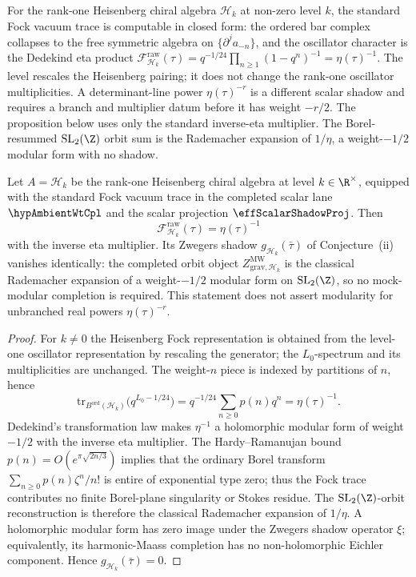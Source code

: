 For the rank-one Heisenberg chiral algebra $\mathcal H_{k}$ at
non-zero level \(k\), the standard Fock vacuum trace is computable in
closed form: the ordered bar complex collapses to the free symmetric
algebra on $\{\partial^{j} a_{-n}\}$, and the oscillator character is the
Dedekind eta product
$\mathcal F^{\mathrm{raw}}_{\mathcal H_{k}}(\tau)
= q^{-1/24}\prod_{n \ge 1}(1 - q^{n})^{-1}
= \eta(\tau)^{-1}$.
The level rescales the Heisenberg pairing; it does not change the
rank-one oscillator multiplicities. A determinant-line power
\(\eta(\tau)^{-r}\) is a different scalar shadow and requires a branch
and multiplier datum before it has weight \(-r/2\). The proposition
below uses only the standard inverse-eta multiplier. The
Borel-resummed $\mathrm{SL}_{2}(\Z)$ orbit sum is the Rademacher
expansion of \(1/\eta\), a weight-\(-1/2\) modular form with no shadow.

\begin{proposition}
\label{prop:3dg-zwegers-heisenberg-shadow}
%
Let \(A=\mathcal H_k\) be the rank-one Heisenberg chiral algebra at
level \(k\in\R^{\times}\), equipped with the standard Fock vacuum trace
in the completed scalar lane \(\hypAmbientWtCpl\) and the scalar
projection \(\effScalarShadowProj\). Then
\[
\mathcal F^{\mathrm{raw}}_{\mathcal H_k}(\tau)=\eta(\tau)^{-1}
\]
with the inverse eta multiplier. Its Zwegers shadow
\(g_{\mathcal H_k}(\bar\tau)\) of Conjecture~\textup{(ii)} vanishes
identically: the completed orbit object
\(Z^{\mathrm{MW}}_{\mathrm{grav},\mathcal H_k}\) is the classical
Rademacher expansion of a weight-\(-1/2\) modular form on
\(\mathrm{SL}_{2}(\Z)\), so no mock-modular completion is required.
This statement does not assert modularity for unbranched real powers
\(\eta(\tau)^{-r}\).
\end{proposition}

\begin{proof}
For \(k\ne0\) the Heisenberg Fock representation is obtained from the
level-one oscillator representation by rescaling the generator; the
\(L_0\)-spectrum and its multiplicities are unchanged. The weight-\(n\)
piece is indexed by partitions of \(n\), hence
\[
\mathrm{tr}_{B^{\mathrm{ord}}(\mathcal H_k)}
\bigl(q^{L_0-1/24}\bigr)
=q^{-1/24}\sum_{n\ge0}p(n)q^n
=\eta(\tau)^{-1}.
\]
Dedekind's transformation law makes \(\eta^{-1}\) a holomorphic
modular form of weight \(-1/2\) with the inverse eta multiplier. The
Hardy--Ramanujan bound \(p(n)=O(e^{\pi\sqrt{2n/3}})\) implies that the
ordinary Borel transform \(\sum_{n\ge0}p(n)\zeta^n/n!\) is entire of
exponential type zero; thus the Fock trace contributes no finite
Borel-plane singularity or Stokes residue. The
\(\mathrm{SL}_{2}(\Z)\)-orbit reconstruction is therefore the classical
Rademacher expansion of \(1/\eta\). A holomorphic modular form has zero
image under the Zwegers shadow operator \(\xi\); equivalently, its
harmonic-Maass completion has no non-holomorphic Eichler component.
Hence \(g_{\mathcal H_k}(\bar\tau)=0\).
\end{proof}

